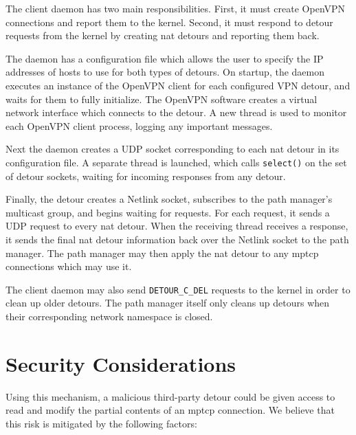 \documentclass{cwru}
\begin{document}
The client daemon has two main responsibilities. First, it must create OpenVPN
connections and report them to the kernel. Second, it must respond to detour
requests from the kernel by creating \ac{nat} detours and reporting them back.

The daemon has a configuration file which allows the user to specify the IP
addresses of hosts to use for both types of detours. On startup, the daemon
executes an instance of the OpenVPN client for each configured VPN detour, and
waits for them to fully initialize. The OpenVPN software creates a virtual
network interface which connects to the detour. A new thread is used to monitor
each OpenVPN client process, logging any important messages.

Next the daemon creates a UDP socket corresponding to each \ac{nat} detour in
its configuration file. A separate thread is launched, which calls
\texttt{select()} on the set of detour sockets, waiting for incoming responses
from any detour.

Finally, the detour creates a Netlink socket, subscribes to the path manager's
multicast group, and begins waiting for requests. For each request, it sends a
UDP request to every \ac{nat} detour. When the receiving thread receives a
response, it sends the final \ac{nat} detour information back over the Netlink
socket to the path manager. The path manager may then apply the \ac{nat} detour
to any \ac{mptcp} connections which may use it.

The client daemon may also send \texttt{DETOUR\_C\_DEL} requests to the kernel
in order to clean up older detours. The path manager itself only cleans up
detours when their corresponding network namespace is closed.

\section{Security Considerations}
\label{sec:security}


Using this mechanism, a malicious third-party detour could be given access to
read and modify the partial contents of an \ac{mptcp} connection. We believe
that this risk is mitigated by the following factors:
\end{document}
